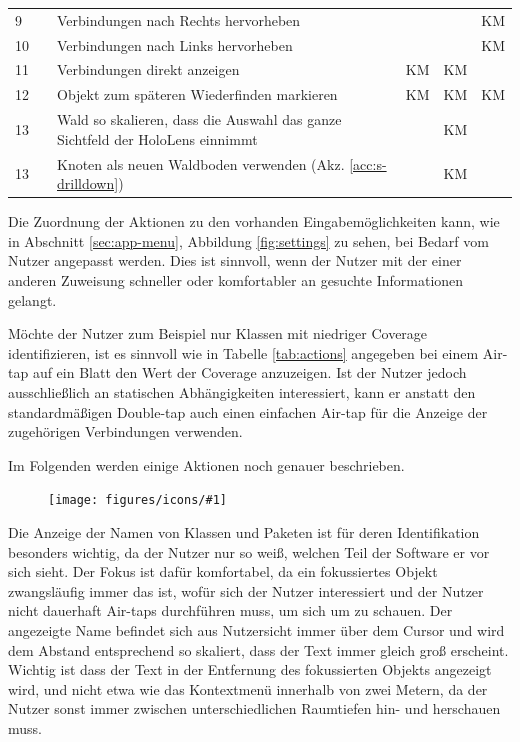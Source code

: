 \begin{tabularx}{\textwidth}{lm{1cm}L*{3}{C{2cm}}}
   9 &  & Verbindungen nach Rechts hervorheben            &              &               & KM           \\
  10 &  & Verbindungen nach Links hervorheben              &              &               & KM           \\
  11 &  & Verbindungen direkt anzeigen                      & KM           & KM            &              \\
  12 &  & Objekt zum späteren Wiederfinden markieren       & KM           & KM            & KM           \\
  13 &  & Wald so skalieren, dass die Auswahl das
           ganze Sichtfeld der HoloLens einnimmt                      &              & KM            &              \\
  13 &  & Knoten als neuen Waldboden verwenden
       (Akz. \ref{acc:s-drilldown})                                   &              & KM            &              \\
\end{tabularx}

Die Zuordnung der Aktionen zu den vorhanden Eingabemöglichkeiten kann, wie in Abschnitt \ref{sec:app-menu}, Abbildung \ref{fig:settings} zu sehen, bei Bedarf vom Nutzer angepasst werden. Dies ist sinnvoll, wenn der Nutzer mit der einer anderen Zuweisung schneller oder komfortabler an gesuchte Informationen gelangt.

Möchte der Nutzer zum Beispiel nur Klassen mit niedriger Coverage identifizieren, ist es sinnvoll wie in Tabelle \ref{tab:actions} angegeben bei einem Air-tap auf ein Blatt den Wert der Coverage anzuzeigen. Ist der Nutzer jedoch ausschließlich an statischen Abhängigkeiten interessiert, kann er anstatt den standardmäßigen Double-tap auch einen einfachen Air-tap für die Anzeige der zugehörigen Verbindungen verwenden.

Im Folgenden werden einige Aktionen noch genauer beschrieben. \\

\newcommand{\inlineicon}[1]{
  \setlength\intextsep{0pt}
  \begin{figure}
    \texttt{[image: figures/icons/\#1]}
  \end{figure}
}

\begingroup

\inlineicon{info}\noindent Die Anzeige der Namen von Klassen und Paketen ist für deren Identifikation besonders wichtig, da der Nutzer nur so weiß, welchen Teil der Software er vor sich sieht. Der Fokus ist dafür komfortabel, da ein fokussiertes Objekt zwangsläufig immer das ist, wofür sich der Nutzer interessiert und der Nutzer nicht dauerhaft Air-taps durchführen muss, um sich um zu schauen. Der angezeigte Name befindet sich aus Nutzersicht immer über dem Cursor und wird dem Abstand entsprechend so skaliert, dass der Text immer gleich groß erscheint. Wichtig ist dass der Text in der Entfernung des fokussierten Objekts angezeigt wird, und nicht etwa wie das Kontextmenü innerhalb von zwei Metern, da der Nutzer sonst immer zwischen unterschiedlichen Raumtiefen hin- und herschauen muss.\\

